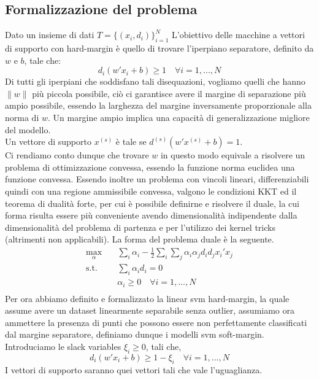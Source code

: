 \documentclass[12pt]{extarticle}
\begin{document}
\subsection{Formalizzazione del problema}
Dato un insieme di dati $T = \{(x_i, d_i)\}_{i=1}^N$ L'obiettivo delle macchine a vettori di supporto con hard-margin è quello di trovare l'iperpiano separatore, definito da $w$ e $b$, tale che:
\[d_i(w'x_i + b) \geq 1 \quad \forall i = 1, ..., N\]
Di tutti gli iperpiani che soddisfano tali disequazioni, vogliamo quelli che hanno $\| w \|$ più piccola possibile, ciò ci garantisce avere il margine di separazione più ampio possibile, essendo la larghezza del margine inversamente proporzionale alla norma di $w$. Un margine ampio implica una capacità di generalizzazione migliore del modello.\\
Un vettore di supporto $x^{(s)}$ è tale se $d^{(s)}(w'x^{(s)} +b) = 1$.\\
Ci rendiamo conto dunque che trovare $w$ in questo modo equivale a risolvere un problema di ottimizzazione convessa, essendo la funzione norma euclidea una funzione convessa. Essendo inoltre un problema con vincoli lineari, differenziabili quindi con una regione ammissibile convessa, valgono le condizioni KKT ed il teorema di dualità forte, per cui è possibile definirne e risolvere il duale, la cui forma risulta essere più conveniente avendo dimensionalità indipendente dalla dimensionalità del problema di partenza e  per l'utilizzo dei kernel tricks (altrimenti non applicabili). La forma del problema duale è la seguente.
\begin{equation}
\begin{aligned}
\max_{\alpha} \quad & \sum_i \alpha_i - \frac{1}{2}\sum_i \sum_j \alpha_i \alpha_j d_i d_j x_i'x_j\\
\textrm{s.t.} \quad & \sum_i \alpha_i d_i = 0\\
  & \alpha_i \geq 0 \quad \forall i = 1, ..., N\\
\end{aligned}
\end{equation}
Per ora abbiamo definito e formalizzato la linear svm hard-margin, la quale assume avere un dataset linearmente separabile senza outlier, assumiamo ora ammettere la presenza di punti che possono essere non perfettamente classificati dal margine separatore, definiamo dunque i modelli svm soft-margin.\\
Introduciamo le slack variables $\xi_i \geq 0$, tali che,
\[d_i(w'x_i + b) \geq 1 - \xi_i \quad \forall i = 1, ..., N\]
I vettori di supporto saranno quei vettori tali che vale l'uguaglianza.\\
\end{document}
